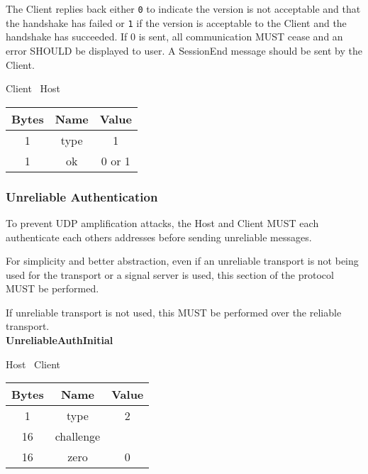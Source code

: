 The Client replies back either \texttt{0} to indicate the version is not acceptable and that the handshake has
failed or \texttt{1} if the version is acceptable to the Client and the handshake has succeeded.
If 0 is sent, all communication MUST cease and an error SHOULD be displayed to user.
A SessionEnd message should be sent by the Client.

\begin{center}
    Client \textrightarrow\ Host\\
    \begin{tabular}{|c|c|c|}
        \hline
        \textbf{Bytes} & \textbf{Name} & \textbf{Value} \\
        \hline
        1              & type          & 1              \\
        \hline
        1              & ok            & 0 or 1         \\
        \hline
    \end{tabular}
\end{center}

\subsubsection{Unreliable Authentication}

To prevent UDP amplification attacks, the Host and Client MUST each authenticate each others addresses before sending
unreliable messages.

For simplicity and better abstraction, even if an unreliable transport is not being used for the transport or a
signal server is used, this section of the protocol MUST be performed.

If unreliable transport is not used, this MUST be performed over the reliable transport.\\

\textbf{UnreliableAuthInitial}
\begin{center}
    Host \textrightarrow\ Client\\
    \begin{tabular}{|c|c|c|}
        \hline
        \textbf{Bytes} & \textbf{Name} & \textbf{Value} \\
        \hline
        1              & type          & 2              \\
        \hline
        16             & challenge     &                \\
        \hline
        16             & zero          & 0              \\
        \hline
    \end{tabular}
\end{center}


